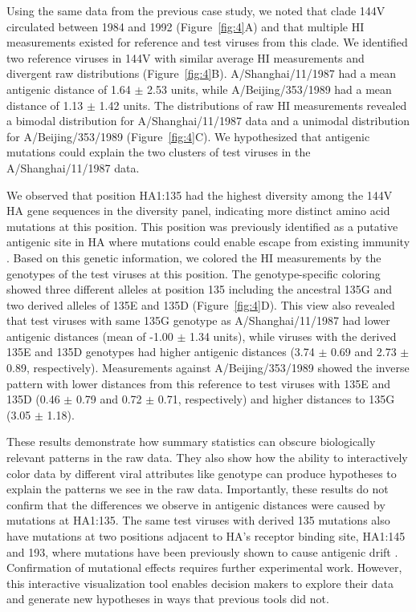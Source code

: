 \documentclass[utf8]{FrontiersinHarvard} %
\begin{document}
Using the same data from the previous case study, we noted that clade 144V circulated between 1984 and 1992 (Figure~\ref{fig:4}A) and that multiple HI measurements existed for reference and test viruses from this clade.
We identified two reference viruses in 144V with similar average HI measurements and divergent raw distributions (Figure~\ref{fig:4}B).
A/Shanghai/11/1987 had a mean antigenic distance of 1.64 $\pm$ 2.53 units, while A/Beijing/353/1989 had a mean distance of 1.13 $\pm$ 1.42 units.
The distributions of raw HI measurements revealed a bimodal distribution for A/Shanghai/11/1987 data and a unimodal distribution for A/Beijing/353/1989 (Figure~\ref{fig:4}C).
We hypothesized that antigenic mutations could explain the two clusters of test viruses in the A/Shanghai/11/1987 data.

We observed that position HA1:135 had the highest diversity among the 144V HA gene sequences in the diversity panel, indicating more distinct amino acid mutations at this position.
This position was previously identified as a putative antigenic site in HA where mutations could enable escape from existing immunity \citep{Wolf:2006da}.
Based on this genetic information, we colored the HI measurements by the genotypes of the test viruses at this position.
The genotype-specific coloring showed three different alleles at position 135 including the ancestral 135G and two derived alleles of 135E and 135D (Figure~\ref{fig:4}D).
This view also revealed that test viruses with same 135G genotype as A/Shanghai/11/1987 had lower antigenic distances (mean of -1.00 $\pm$ 1.34 units), while viruses with the derived 135E and 135D genotypes had higher antigenic distances (3.74 $\pm$ 0.69 and 2.73 $\pm$ 0.89, respectively).
Measurements against A/Beijing/353/1989 showed the inverse pattern with lower distances from this reference to test viruses with 135E and 135D (0.46 $\pm$ 0.79 and 0.72 $\pm$ 0.71, respectively) and higher distances to 135G (3.05 $\pm$ 1.18).

These results demonstrate how summary statistics can obscure biologically relevant patterns in the raw data.
They also show how the ability to interactively color data by different viral attributes like genotype can produce hypotheses to explain the patterns we see in the raw data.
Importantly, these results do not confirm that the differences we observe in antigenic distances were caused by mutations at HA1:135.
The same test viruses with derived 135 mutations also have mutations at two positions adjacent to HA's receptor binding site, HA1:145 and 193, where mutations have been previously shown to cause antigenic drift \citep{Koel:2013jz}.
Confirmation of mutational effects requires further experimental work.
However, this interactive visualization tool enables decision makers to explore their data and generate new hypotheses in ways that previous tools did not.
\end{document}

